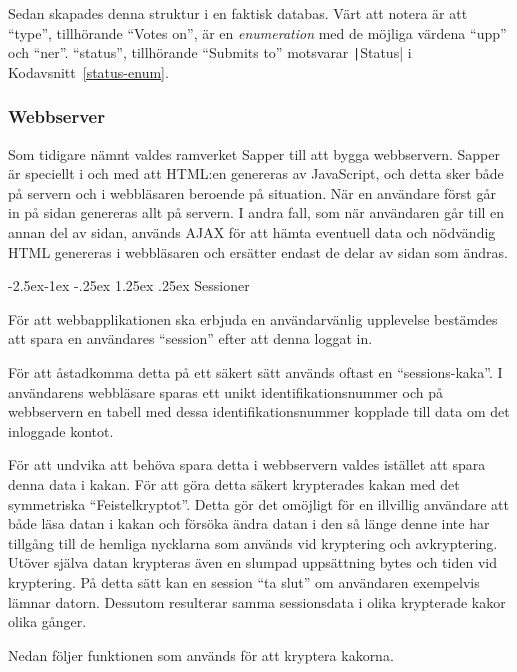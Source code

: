 \documentclass{article}
\makeatletter
\renewcommand*\listingscaption{Kodavsnitt}
\newcommand*\coderef[1]{\listingscaption~\ref{#1}}
\renewcommand*\paragraph{\@startsection{paragraph}{4}{\z@}%
			{-2.5ex\@plus -1ex \@minus -.25ex}%
			{1.25ex \@plus .25ex}%
			{\normalfont\normalsize\bfseries}}
\makeatother
\begin{document}
Sedan skapades denna struktur i en faktisk databas. Värt att notera är att
``type'', tillhörande ``Votes on'', är en \textit{enumeration} med de möjliga
värdena ``upp'' och ``ner''. ``status'', tillhörande ``Submits to'' motsvarar
\texttt|Status| i \coderef{status-enum}.

\subsubsection{Webbserver}
\label{webbserver}

Som tidigare nämnt valdes ramverket Sapper till att bygga webbservern. Sapper är
speciellt i och med att HTML:en genereras av JavaScript, och detta sker både på
servern och i webbläsaren beroende på situation. När en användare först går in
på sidan genereras allt på servern. I andra fall, som när användaren går till en
annan del av sidan, används AJAX för att hämta eventuell data och nödvändig HTML
genereras i webbläsaren och ersätter endast de delar av sidan som ändras.

\paragraph{Sessioner}

För att webbapplikationen ska erbjuda en användarvänlig upplevelse bestämdes att
spara en användares ``session'' efter att denna loggat in.

För att åstadkomma detta på ett säkert sätt används oftast en ``sessions-kaka''.
I användarens webbläsare sparas ett unikt identifikationsnummer och på
webbservern en tabell med dessa identifikationsnummer kopplade till data om det
inloggade kontot.


För att undvika att behöva spara detta i webbservern valdes istället att spara
denna data i kakan. För att göra detta säkert krypterades kakan med det
symmetriska ``Feistelkryptot''. Detta gör det omöjligt för en illvillig
användare att både läsa datan i kakan och försöka ändra datan i den så länge
denne inte har tillgång till de hemliga nycklarna som används vid kryptering och
avkryptering. Utöver själva datan krypteras även en slumpad uppsättning bytes
och tiden vid kryptering. På detta sätt kan en session ``ta slut'' om användaren
exempelvis lämnar datorn. Dessutom resulterar samma sessionsdata i olika
krypterade kakor olika gånger.

Nedan följer funktionen som används för att kryptera kakorna.
\end{document}
